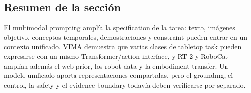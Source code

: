 
\subsection{Resumen de la sección}

El multimodal prompting amplía la specification de la tarea: texto, imágenes objetivo, conceptos temporales, demostraciones y constraint pueden entrar en un contexto unificado. VIMA demuestra que varias clases de tabletop task pueden expresarse con un mismo Transformer/action interface, y RT-2 y RoboCat amplían además el web prior, los robot data y la embodiment transfer. Un modelo unificado aporta representaciones compartidas, pero el grounding, el control, la safety y el evidence boundary todavía deben verificarse por separado.
